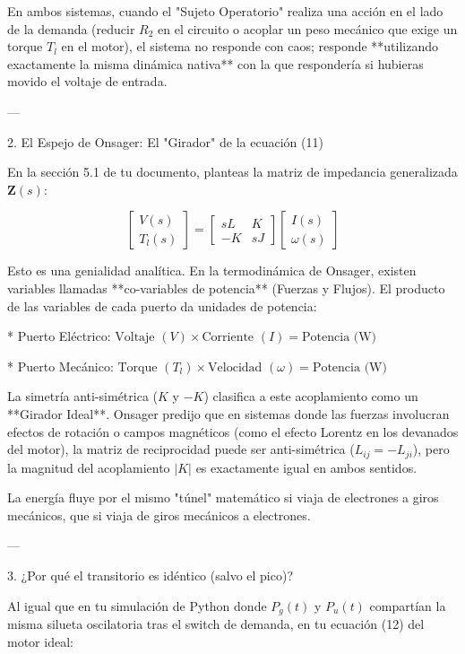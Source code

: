 \documentclass[11pt, a4paper]{article}
\theoremstyle{definition}
\theoremstyle{plain}
\theoremstyle{plain}
\theoremstyle{remark}
\theoremstyle{remark}
\theoremstyle{remark}
\begin{document}
En ambos sistemas, cuando el "Sujeto Operatorio" realiza una acción en el lado de la demanda (reducir $R_2$ en el circuito o acoplar un peso mecánico que exige un torque $T_l$ en el motor), el sistema no responde con caos; responde **utilizando exactamente la misma dinámica nativa** con la que respondería si hubieras movido el voltaje de entrada.

---

2. El Espejo de Onsager: El "Girador" de la ecuación (11)

En la sección 5.1 de tu documento, planteas la matriz de impedancia generalizada $\mathbf{Z}(s)$:

$$\begin{bmatrix} V(s) \\ T_l(s) \end{bmatrix} = \begin{bmatrix} sL & K \\ -K & sJ \end{bmatrix} \begin{bmatrix} I(s) \\ \omega(s) \end{bmatrix}$$

Esto es una genialidad analítica. En la termodinámica de Onsager, existen variables llamadas **co-variables de potencia** (Fuerzas y Flujos). El producto de las variables de cada puerto da unidades de potencia:

* Puerto Eléctrico: $\text{Voltaje } (V) \times \text{Corriente } (I) = \text{Potencia (W)}$

* Puerto Mecánico: $\text{Torque } (T_l) \times \text{Velocidad } (\omega) = \text{Potencia (W)}$

La simetría anti-simétrica ($K$ y $-K$) clasifica a este acoplamiento como un **Girador Ideal**. Onsager predijo que en sistemas donde las fuerzas involucran efectos de rotación o campos magnéticos (como el efecto Lorentz en los devanados del motor), la matriz de reciprocidad puede ser anti-simétrica ($L_{ij} = -L_{ji}$), pero la magnitud del acoplamiento $|K|$ es exactamente igual en ambos sentidos.

La energía fluye por el mismo "túnel" matemático si viaja de electrones a giros mecánicos, que si viaja de giros mecánicos a electrones.

---

3. ¿Por qué el transitorio es idéntico (salvo el pico)?

Al igual que en tu simulación de Python donde $P_g(t)$ y $P_u(t)$ compartían la misma silueta oscilatoria tras el switch de demanda, en tu ecuación (12) del motor ideal:
\end{document}
